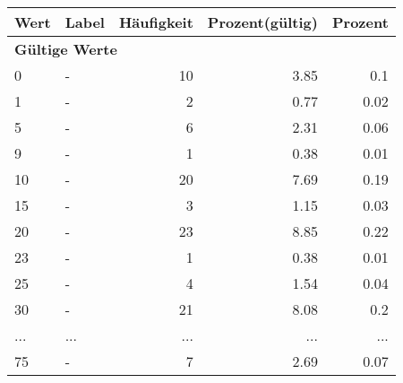      \begin{longtable}{lXrrr}
     \toprule
     \textbf{Wert} & \textbf{Label} & \textbf{Häufigkeit} & \textbf{Prozent(gültig)} & \textbf{Prozent} \\
     \endhead
     \midrule
     \multicolumn{5}{l}{\textbf{Gültige Werte}}\\
        0 & \multicolumn{1}{X}{-} & %
          \num{10} &
          \num[round-mode=places,round-precision=2]{3.85} &
          \num[round-mode=places,round-precision=2]{0.1} \\
        1 & \multicolumn{1}{X}{-} & %
          \num{2} &
          \num[round-mode=places,round-precision=2]{0.77} &
          \num[round-mode=places,round-precision=2]{0.02} \\
        5 & \multicolumn{1}{X}{-} & %
          \num{6} &
          \num[round-mode=places,round-precision=2]{2.31} &
          \num[round-mode=places,round-precision=2]{0.06} \\
        9 & \multicolumn{1}{X}{-} & %
          \num{1} &
          \num[round-mode=places,round-precision=2]{0.38} &
          \num[round-mode=places,round-precision=2]{0.01} \\
        10 & \multicolumn{1}{X}{-} & %
          \num{20} &
          \num[round-mode=places,round-precision=2]{7.69} &
          \num[round-mode=places,round-precision=2]{0.19} \\
        15 & \multicolumn{1}{X}{-} & %
          \num{3} &
          \num[round-mode=places,round-precision=2]{1.15} &
          \num[round-mode=places,round-precision=2]{0.03} \\
        20 & \multicolumn{1}{X}{-} & %
          \num{23} &
          \num[round-mode=places,round-precision=2]{8.85} &
          \num[round-mode=places,round-precision=2]{0.22} \\
        23 & \multicolumn{1}{X}{-} & %
          \num{1} &
          \num[round-mode=places,round-precision=2]{0.38} &
          \num[round-mode=places,round-precision=2]{0.01} \\
        25 & \multicolumn{1}{X}{-} & %
          \num{4} &
          \num[round-mode=places,round-precision=2]{1.54} &
          \num[round-mode=places,round-precision=2]{0.04} \\
        30 & \multicolumn{1}{X}{-} & %
          \num{21} &
          \num[round-mode=places,round-precision=2]{8.08} &
          \num[round-mode=places,round-precision=2]{0.2} \\
       ... & ... & ... & ... & ... \\
        75 & \multicolumn{1}{X}{-} & %
          \num{7} &
          \num[round-mode=places,round-precision=2]{2.69} &
          \num[round-mode=places,round-precision=2]{0.07} \\


\end{longtable}
